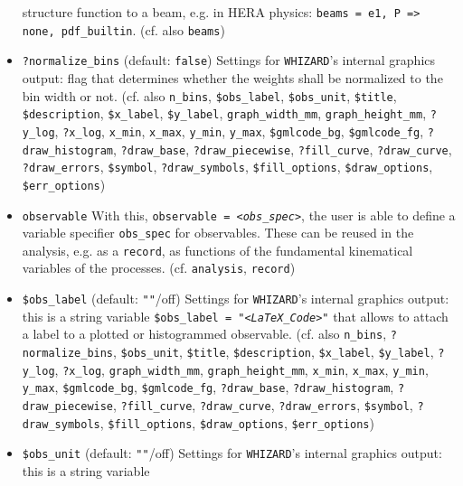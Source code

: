 \documentclass[12pt]{book}
\newcommand{\ttt}[1]{\texttt{#1}}
\newcommand{\whizard}{\texttt{WHIZARD}}
\begin{document}
\begin{itemize}
structure function to a beam, e.g. in HERA physics: \ttt{beams = e1, P
  => none, pdf\_builtin}. (cf. also \ttt{beams})
\item
\ttt{?normalize\_bins} \qquad (default: \ttt{false}) \newline
Settings for \whizard's internal graphics output: flag that determines
whether the weights shall be normalized to the bin width or not. (cf. also
\ttt{n\_bins}, \ttt{\$obs\_label}, \ttt{\$obs\_unit},
\ttt{\$title}, \ttt{\$description}, \ttt{\$x\_label},
\ttt{\$y\_label}, \ttt{graph\_width\_mm}, \ttt{graph\_height\_mm},
\ttt{?y\_log}, \ttt{?x\_log}, \ttt{x\_min}, \ttt{x\_max},
\ttt{y\_min}, \ttt{y\_max}, \ttt{\$gmlcode\_bg}, \ttt{\$gmlcode\_fg},
\ttt{?draw\_histogram}, \newline \ttt{?draw\_base}, \ttt{?draw\_piecewise},
\ttt{?fill\_curve}, \ttt{?draw\_curve}, \ttt{?draw\_errors}, \ttt{\$symbol}, 
\newline \ttt{?draw\_symbols}, \ttt{\$fill\_options}, \ttt{\$draw\_options},
\ttt{\$err\_options})
\item
\ttt{observable} \newline
With this, \ttt{observable = {\em <obs\_spec>}}, the user is able to define
a variable specifier \ttt{obs\_spec} for observables. These can be
reused in the analysis, e.g. as a \ttt{record}, as functions of the
fundamental kinematical variables of the processes. 
(cf. \ttt{analysis}, \ttt{record})
\item
\ttt{\$obs\_label} \qquad (default: \ttt{""}/off) \newline
Settings for \whizard's internal graphics output: this is a string variable
\ttt{\$obs\_label = "{\em <LaTeX\_Code>}"} that allows to attach a label to
a plotted or histogrammed observable. (cf. also 
\ttt{n\_bins}, \ttt{?normalize\_bins}, \ttt{\$obs\_unit},
\ttt{\$title}, \ttt{\$description}, \ttt{\$x\_label},
\ttt{\$y\_label}, \ttt{?y\_log}, \ttt{?x\_log},
\ttt{graph\_width\_mm}, \ttt{graph\_height\_mm}, 
\ttt{x\_min}, \ttt{x\_max}, \ttt{y\_min}, \ttt{y\_max},
\ttt{\$gmlcode\_bg}, \ttt{\$gmlcode\_fg}, \ttt{?draw\_base},
\ttt{?draw\_histogram}, \ttt{?draw\_piecewise}, \newline
\ttt{?fill\_curve}, \ttt{?draw\_curve}, \ttt{?draw\_errors}, \ttt{\$symbol}, 
\ttt{?draw\_symbols}, \ttt{\$fill\_options}, \ttt{\$draw\_options},
\ttt{\$err\_options})
\item
\ttt{\$obs\_unit} \qquad (default: \ttt{""}/off) \newline
Settings for \whizard's internal graphics output: this is a string variable

\end{itemize}
\end{document}
